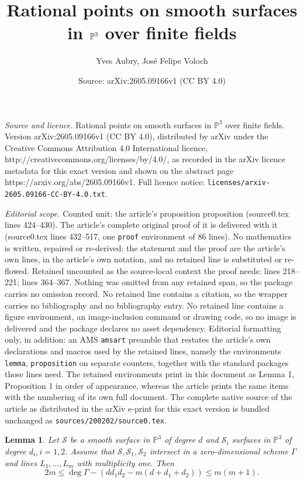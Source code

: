 \documentclass[10pt,a4paper]{amsart}
\title{Rational points on smooth surfaces in $\PP^3$ over finite fields}
\author{Yves Aubry, Jos\'e Felipe Voloch}
\date{Source: arXiv:2605.09166v1 (CC BY 4.0)}
\newtheorem{lemma}{Lemma}
\newcommand{\PP}{{\mathbb P}}
\newcommand{\calS}{{\mathcal S}}
\begin{document}
\maketitle

\noindent\emph{Source and licence.} Rational points on smooth surfaces in $\PP^3$ over finite fields. Version arXiv:2605.09166v1 (CC BY 4.0), distributed by arXiv under the Creative Commons Attribution 4.0 International licence, http://creativecommons.org/licenses/by/4.0/, as recorded in the arXiv licence metadata for this exact version and shown on the abstract page https://arxiv.org/abs/2605.09166v1. Full licence notice: \texttt{licenses/arxiv-2605.09166-CC-BY-4.0.txt}.\par\smallskip

\noindent\textit{Editorial scope.} Counted unit: the article's proposition proposition (source0.tex lines 424--430). The article's complete original proof of it is delivered with it (source0.tex lines 432--517, one \texttt{proof} environment of 86 lines). No mathematics is written, repaired or re-derived: the statement and the proof are the article's own lines, in the article's own notation, and no retained line is substituted or re-flowed.  Retained uncounted as the source-local context the proof needs: lines 218--221; lines 364--367.  Nothing was omitted from any retained span, so the package carries no omission record.  No retained line contains a citation, so the wrapper carries no bibliography and no bibliography entry.  No retained line contains a figure environment, an image-inclusion command or drawing code, so no image is delivered and the package declares no asset dependency.  Editorial formatting only, in addition: an AMS \texttt{amsart} preamble that restates the article's own declarations and macros used by the retained lines, namely the environments \texttt{lemma}, \texttt{proposition} on separate counters, together with the standard packages those lines need.  The retained environments print in this document as Lemma 1, Proposition 1 in order of appearance, whereas the article prints the same items with the numbering of its own full document.  The complete native source of the article as distributed in the arXiv e-print for this exact version is bundled unchanged as \texttt{sources/200202/source0.tex}.
\begin{lemma}\label{Fondamental_Lemma}
    Let $\calS$ be a smooth surface in $\PP^3$ of degree $d$ and $\calS_i$ surfaces in $\PP^3$ of degree $d_i, i=1,2$. Assume that $\calS,\calS_1,\calS_2$ intersect in a zero-dimensional scheme $\Gamma$ and lines $L_1,\ldots,L_m$ with multiplicity one. Then
    $$2m \le \deg \Gamma - (dd_1d_2 -m(d+d_1+d_2)) \le m(m+1).$$
\end{lemma}
\end{document}
